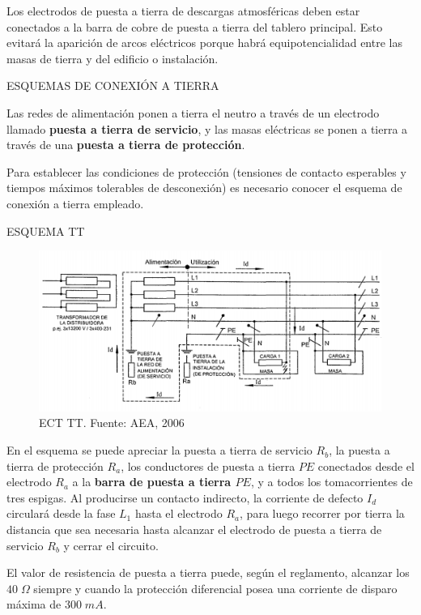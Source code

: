 Los electrodos de puesta a tierra de descargas atmosféricas deben estar conectados a la barra de cobre de puesta a tierra del tablero principal. Esto evitará la aparición de arcos eléctricos porque habrá equipotencialidad entre las masas de tierra y del edificio o instalación.


ESQUEMAS DE CONEXIÓN A TIERRA

Las redes de alimentación ponen a tierra el neutro a través de un electrodo llamado \textbf{puesta a tierra de servicio}, y las masas eléctricas se ponen a tierra a través de una \textbf{puesta a tierra de protección}.

Para establecer las condiciones de protección (tensiones de contacto esperables y tiempos máximos tolerables de desconexión) es necesario conocer el esquema de conexión a tierra empleado.

ESQUEMA TT

\begin{figure}[htbp]
  \centering  
  \includegraphics[width=\textwidth]{images/ect-tt}
  \caption{ECT TT. Fuente: AEA, 2006}
  \label{fig:ect-tt}
\end{figure}

En el esquema se puede apreciar la puesta a tierra de servicio $R_b$, la puesta a tierra de protección $R_a$, los conductores de puesta a tierra $PE$ conectados desde el electrodo $R_a$ a la \textbf{barra de puesta a tierra $PE$}, y a todos los tomacorrientes de tres espigas.
Al producirse un contacto indirecto, la corriente de defecto $I_d$ circulará desde la fase $L_1$ hasta el electrodo $R_a$, para luego recorrer por tierra la distancia que sea necesaria hasta alcanzar el electrodo de puesta a tierra de servicio $R_b$ y cerrar el circuito.

El valor de resistencia de puesta a tierra puede, según el reglamento, alcanzar los $40\; \Omega$ siempre y cuando la protección diferencial posea una corriente de disparo máxima de $300\; mA$.

